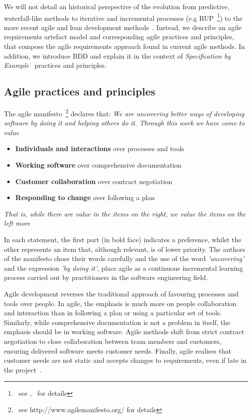 \documentclass[dissertation,final]{softeng}
\begin{document}
We will not detail an historical perspective of the evolution from predictive, waterfall-like methods to iterative and incremental processes (e.g RUP~\footnote{~see ,~\citet{Kruchten2003} for details}) to the more recent agile and lean development methods~\citep{Leffingwell2011,Larman2003}. Instead, we describe an agile requirements artefact model and corresponding agile practices and principles, that compose the agile requirements approach found in current agile methods. In addition, we introduce BDD and explain it in the context of \emph{Specification by Example}~\citep{Adzic201106} practices and principles.

\subsection{Agile practices and principles}
The agile manifesto~\footnote{~see http://www.agilemanifesto.org/ for details} declares that: 
\emph{We are uncovering better ways of developing software by doing it and helping others do it. Through this work we have come to value}

\begin{itemize}
\item \textbf{Individuals and interactions} over processes and tools
\item \textbf{Working software} over comprehensive documentation
\item \textbf{Customer collaboration} over contract negotiation
\item \textbf{Responding to change} over following a plan
\end{itemize}
\emph{That is, while there are value in the items on the right, we value the items on the left more}

In each statement, the first part (in bold face) indicates a preference, whilst the other represents an item that, although relevant, is of lower priority. The authors of the manifesto chose their words carefully and the use of the word \emph{'uncovering'} and the expression \emph{'by doing it'}, place agile as a continuous incremental learning process carried out by practitioners in the software engineering field.

Agile development reverses the traditional approach of favouring processes and tools over people. In agile, the emphasis is much more on people collaboration and interaction than in following a plan or using a particular set of tools. Similarly, while comprehensive documentation is not a problem in itself, the emphasis should be in working software. Agile methods shift from strict contract negotiation to close collaboration between team members and customers, ensuring delivered software meets customer needs. Finally, agile realises that customer needs are not static and accepts changes to requirements, even if late in the project~\citep{Highsmith:2000:ASD:323922}. 
\end{document}
